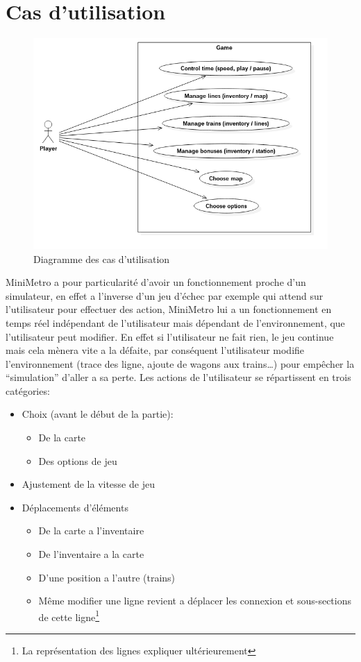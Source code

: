 \documentclass[report, backcover, french, nodocumentinfo]{upmethodology-document}
\begin{document}
		\section{Cas d'utilisation}
			\begin{figure}[h!]
				\centering
				\includegraphics[width=\textwidth]{figures/UseCaseDiagram}
				\caption{Diagramme des cas d'utilisation}
				\label{fig:UseCaseDiagram}
			\end{figure}
				MiniMetro a pour particularité d'avoir un fonctionnement proche d'un simulateur, en effet a l'inverse d'un jeu d'échec par exemple qui attend sur l'utilisateur pour effectuer des action, MiniMetro lui a un fonctionnement en temps réel indépendant de l'utilisateur mais dépendant de l’environnement, que l'utilisateur peut modifier. En effet si l'utilisateur ne fait rien, le jeu continue mais cela mènera vite a la défaite, par conséquent l'utilisateur modifie l’environnement (trace des ligne, ajoute de wagons aux trains\ldots) pour empêcher la ``simulation'' d'aller a sa perte.
				Les actions de l'utilisateur se répartissent en trois catégories:
				\begin{itemize}
					\item Choix (avant le début de la partie):
						\begin{itemize}
							\item De la carte
							\item Des options de jeu
						\end{itemize}
					\item Ajustement de la vitesse de jeu
					\item Déplacements d'éléments
						\begin{itemize}
							\item De la carte a l'inventaire
							\item De l'inventaire a la carte
							\item D'une position a l'autre (trains)
							\item Même modifier une ligne revient a déplacer les connexion et sous-sections de cette ligne\footnote{La représentation des lignes expliquer ultérieurement}
						\end{itemize}
				\end{itemize}
\end{document}
